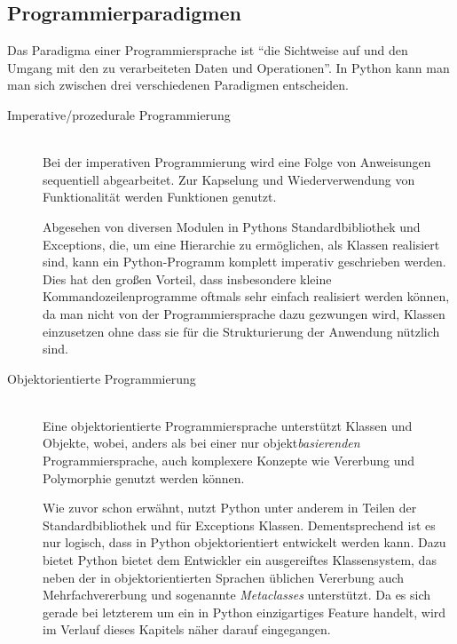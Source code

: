 \subsection{Programmierparadigmen}

Das Paradigma einer Programmiersprache ist \enquote{die Sichtweise auf und den Umgang mit
den zu verarbeiteten Daten und Operationen}. \citep[Kap. 1.3.1]{progsprachen} In Python kann man
man sich zwischen drei verschiedenen Paradigmen entscheiden.

\begin{description}
\item[Imperative/prozedurale Programmierung] \hfill \\
Bei der imperativen Programmierung wird eine Folge von Anweisungen sequentiell abgearbeitet. Zur
Kapselung und Wiederverwendung von Funktionalität werden Funktionen genutzt.
\citep[Kap. 1.3.1]{progsprachen}

Abgesehen von diversen Modulen in Pythons Standardbibliothek und Exceptions, die, um eine Hierarchie
zu ermöglichen, als Klassen realisiert sind, kann ein Python-Programm komplett imperativ geschrieben
werden. Dies hat den großen Vorteil, dass insbesondere kleine Kommandozeilenprogramme oftmals sehr
einfach realisiert werden können, da man nicht von der Programmiersprache dazu gezwungen wird,
Klassen einzusetzen ohne dass sie für die Strukturierung der Anwendung nützlich sind.



\item[Objektorientierte Programmierung] \hfill \\
Eine objektorientierte Programmiersprache unterstützt Klassen und Objekte, wobei, anders als bei
einer nur objekt\emph{basierenden} Programmiersprache, auch komplexere Konzepte wie Vererbung und
Polymorphie genutzt werden können.
\citep[Kap. 1.3.1]{progsprachen}

Wie zuvor schon erwähnt, nutzt Python unter anderem in Teilen der Standardbibliothek und für
Exceptions Klassen. Dementsprechend ist es nur logisch, dass in Python objektorientiert entwickelt
werden kann. Dazu bietet Python bietet dem Entwickler ein ausgereiftes Klassensystem, das neben der
in objektorientierten Sprachen üblichen Vererbung auch Mehrfachvererbung und sogenannte
\emph{Metaclasses} unterstützt. Da es sich gerade bei letzterem um ein in Python einzigartiges
Feature handelt, wird im Verlauf dieses Kapitels näher darauf eingegangen.




\end{description}
